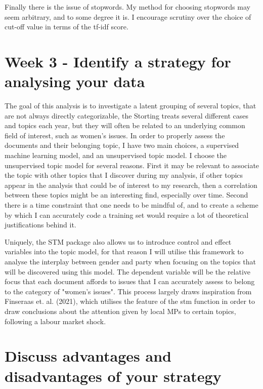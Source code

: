 \documentclass[12pt]{article}
\begin{document}
	Finally there is the issue of stopwords. My method for choosing stopwords may seem arbitrary, and to some degree it is. I encourage scrutiny over the choice of cut-off value in terms of the tf-idf score. 
	
	\section{Week 3 - Identify a strategy for analysing your data}
	
	The goal of this analysis is to investigate a latent grouping of several topics, that are not always directly categorizable, the Storting treats several different cases and topics each year, but they will often be related to an underlying common field of interest, such as women's issues. In order to properly assess the documents and their belonging topic, I have two main choices, a supervised machine learning model, and an unsupervised topic model. I choose the unsupervised topic model for several reasons. First it may be relevant to associate the topic with other topics that I discover during my analysis, if other topics appear in the analysis that could be of interest to my research, then a correlation between these topics might be an interesting find, especially over time. Second there is a time constraint that one needs to be mindful of, and to create a scheme by which I can accurately code a training set would require a lot of theoretical justifications behind it. 
	
	Uniquely, the STM package also allows us to introduce control and effect variables into the topic model, for that reason I will utilise this framework to analyse the interplay between gender and party when focusing on the topics that will be discovered using this model. The dependent variable will be the relative focus that each document affords to issues that I can accurately assess to belong to the category of "women's issues". This process largely draws inspiration from Finseraas et. al. (2021), which utilises the feature of the stm function in order to draw conclusions about the attention given by local MPs to certain topics, following a labour market shock.
	
	\section{Discuss advantages and disadvantages of your strategy}
	
\end{document}
